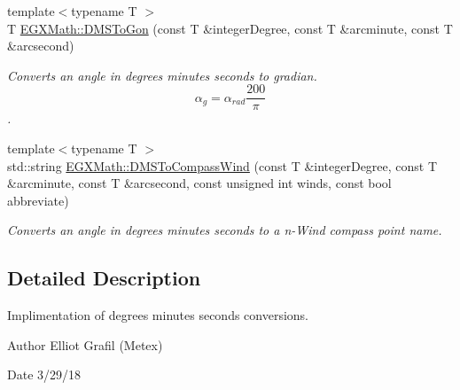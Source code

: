 \begin{DoxyCompactItemize}
{\footnotesize template$<$typename T $>$ }\\T \mbox{\hyperlink{group___e_g_x_math-_conversions-_angle_conversions-_d_m_s_ga47fe1b9127ec6b73ee759eef038a8eb6}{E\+G\+X\+Math\+::\+D\+M\+S\+To\+Gon}} (const T \&integer\+Degree, const T \&arcminute, const T \&arcsecond)
\begin{DoxyCompactList}\small\item\em Converts an angle in degrees minutes seconds to gradian. \[\alpha_{g}=\alpha_{rad}\frac{200}{\pi}\]. \end{DoxyCompactList}\item 
{\footnotesize template$<$typename T $>$ }\\std\+::string \mbox{\hyperlink{group___e_g_x_math-_conversions-_angle_conversions-_d_m_s_ga3beb450aec060ec6d4f0abae7eb7e503}{E\+G\+X\+Math\+::\+D\+M\+S\+To\+Compass\+Wind}} (const T \&integer\+Degree, const T \&arcminute, const T \&arcsecond, const unsigned int winds, const bool abbreviate)
\begin{DoxyCompactList}\small\item\em Converts an angle in degrees minutes seconds to a n-\/\+Wind compass point name. \end{DoxyCompactList}\end{DoxyCompactItemize}


\subsection{Detailed Description}
Implimentation of degrees minutes seconds conversions. 

\begin{DoxyAuthor}{Author}
Elliot Grafil (Metex) 
\end{DoxyAuthor}
\begin{DoxyDate}{Date}
3/29/18 
\end{DoxyDate}
